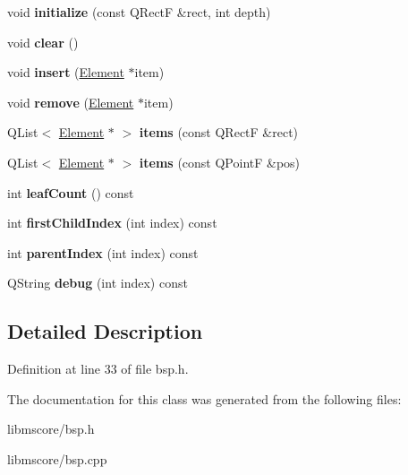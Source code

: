 \begin{DoxyCompactItemize}
\item 
\mbox{\label{class_ms_1_1_bsp_tree_add61c5fed47ea6ad0b9e65d750f4a66e}} 
void {\bfseries initialize} (const Q\+RectF \&rect, int depth)
\item 
\mbox{\label{class_ms_1_1_bsp_tree_a6b98da1cba784ac1bc56c3df75a32895}} 
void {\bfseries clear} ()
\item 
\mbox{\label{class_ms_1_1_bsp_tree_ae781e27bfc7b9ac23de3ddb3909375b0}} 
void {\bfseries insert} (\hyperlink{class_ms_1_1_element}{Element} $\ast$item)
\item 
\mbox{\label{class_ms_1_1_bsp_tree_a3c4c5cf8125f6fef93c149c81416f1b1}} 
void {\bfseries remove} (\hyperlink{class_ms_1_1_element}{Element} $\ast$item)
\item 
\mbox{\label{class_ms_1_1_bsp_tree_a4ab732d32b0e0206fb6a9ea7c53ec30e}} 
Q\+List$<$ \hyperlink{class_ms_1_1_element}{Element} $\ast$ $>$ {\bfseries items} (const Q\+RectF \&rect)
\item 
\mbox{\label{class_ms_1_1_bsp_tree_a9e6c11b7fd68523efe90c4b51ea0135e}} 
Q\+List$<$ \hyperlink{class_ms_1_1_element}{Element} $\ast$ $>$ {\bfseries items} (const Q\+PointF \&pos)
\item 
\mbox{\label{class_ms_1_1_bsp_tree_a9fd0ea1db740108e5928a043dc521abf}} 
int {\bfseries leaf\+Count} () const
\item 
\mbox{\label{class_ms_1_1_bsp_tree_a5c02cac8d9c7514430cc7fc4b89213b9}} 
int {\bfseries first\+Child\+Index} (int index) const
\item 
\mbox{\label{class_ms_1_1_bsp_tree_a9075e4a49712c94b38dfde6a6eacabce}} 
int {\bfseries parent\+Index} (int index) const
\item 
\mbox{\label{class_ms_1_1_bsp_tree_aef6a4f8a958cb36cf403440815232430}} 
Q\+String {\bfseries debug} (int index) const
\end{DoxyCompactItemize}


\subsection{Detailed Description}


Definition at line 33 of file bsp.\+h.



The documentation for this class was generated from the following files\+:\begin{DoxyCompactItemize}
\item 
libmscore/bsp.\+h\item 
libmscore/bsp.\+cpp\end{DoxyCompactItemize}
